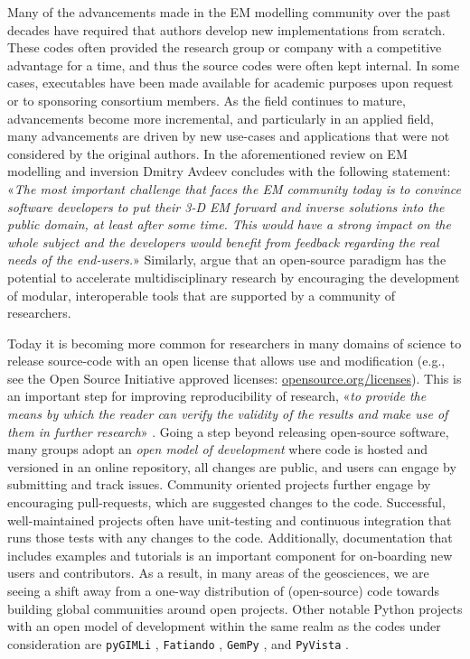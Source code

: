 \documentclass[onecolumn,extra,camera]{gji}
\begin{document}
Many of the advancements made in the EM modelling community over the past decades have required that authors develop new implementations from scratch. These codes often provided the research group or company with a competitive advantage for a time, and thus the source codes were often kept internal. In some cases, executables have been made available for academic purposes upon request or to sponsoring consortium members. As the field continues to mature, advancements become more incremental, and particularly in an applied field, many advancements are driven by new use-cases and applications that were not considered by the original authors. In the aforementioned review on EM modelling and inversion Dmitry Avdeev concludes with the following statement: «\emph{The most important challenge that faces the EM community today is to convince software developers to put their 3-D EM forward and inverse solutions into the public domain, at least after some time. This would have a strong impact on the whole subject and the developers would benefit from feedback regarding the real needs of the end-users.}» Similarly, \cite{EXG.19.Oldenburg} argue that an open-source paradigm has the potential to accelerate multidisciplinary research by encouraging the development of modular, interoperable tools that are supported by a community of researchers.

Today it is becoming more common for researchers in many domains of science to release source-code with an open license that allows use and modification (e.g., see the Open Source Initiative approved licenses: \href{https://opensource.org/licenses}{opensource.org/licenses}). This is an important step for improving reproducibility of research, «\emph{to provide the means by which the reader can verify the validity of the results and make use of them in further research}» \citep{GEO.17.Broggini}. Going a step beyond releasing open-source software, many groups adopt an \emph{open model of development} where code is hosted and versioned in an online repository, all changes are public, and users can engage by submitting and track issues. Community oriented projects further engage by encouraging pull-requests, which are suggested changes to the code. Successful, well-maintained projects often have unit-testing and continuous integration that runs those tests with any changes to the code. Additionally, documentation that includes examples and tutorials is an important component for on-boarding new users and contributors. As a result, in many areas of the geosciences, we are seeing a shift away from a one-way distribution of (open-source) code towards building global communities around open projects. Other notable Python projects with an open model of development within the same realm as the codes under consideration are \texttt{pyGIMLi} \citep{CAG.17.Rucker}, \texttt{Fatiando} \citep{JOSS.18.Uieda}, \texttt{GemPy} \citep{GMD.19.DeLaVarga}, and \texttt{PyVista} \citep{JOSS.19.Sullivan}.
\end{document}
